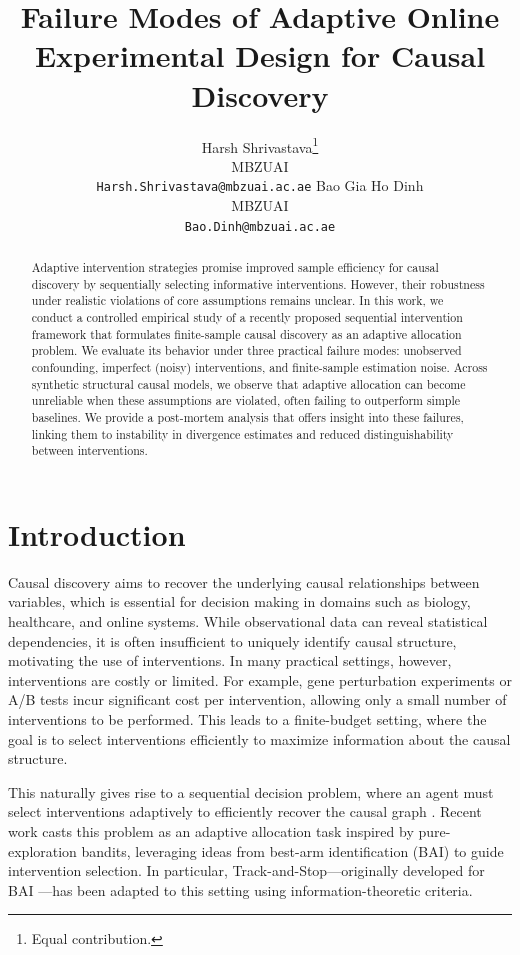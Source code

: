 \documentclass{article}
\title{Failure Modes of Adaptive Online Experimental Design for Causal Discovery}
\author{
Harsh Shrivastava\thanks{Equal contribution.} \\
MBZUAI \\
\texttt{Harsh.Shrivastava@mbzuai.ac.ae}
\And
Bao Gia Ho Dinh\footnotemark[1] \\
MBZUAI \\
\texttt{Bao.Dinh@mbzuai.ac.ae}
}
\begin{document}
\maketitle

\begin{abstract}
Adaptive intervention strategies promise improved sample efficiency for causal discovery by sequentially selecting informative interventions. However, their robustness under realistic violations of core assumptions remains unclear. In this work, we conduct a controlled empirical study of a recently proposed sequential intervention framework that formulates finite-sample causal discovery as an adaptive allocation problem. We evaluate its behavior under three practical failure modes: unobserved confounding, imperfect (noisy) interventions, and finite-sample estimation noise. Across synthetic structural causal models, we observe that adaptive allocation can become unreliable when these assumptions are violated, often failing to outperform simple baselines. We provide a post-mortem analysis that offers insight into these failures, linking them to instability in divergence estimates and reduced distinguishability between interventions.
\end{abstract}

\section{Introduction}
Causal discovery aims to recover the underlying causal relationships between variables, which is essential for decision making in domains such as biology, healthcare, and online systems. While observational data can reveal statistical dependencies, it is often insufficient to uniquely identify causal structure, motivating the use of interventions. In many practical settings, however, interventions are costly or limited. For example, gene perturbation experiments or A/B tests incur significant cost per intervention, allowing only a small number of interventions to be performed. This leads to a finite-budget setting, where the goal is to select interventions efficiently to maximize information about the causal structure.

This naturally gives rise to a sequential decision problem, where an agent must select interventions adaptively to efficiently recover the causal graph \citep{elahi2024adaptive}. Recent work casts this problem as an adaptive allocation task inspired by pure-exploration bandits, leveraging ideas from best-arm identification (BAI) to guide intervention selection. In particular, Track-and-Stop—originally developed for BAI \citealp{garivier2016optimal}—has been adapted to this setting using information-theoretic criteria.
\end{document}
